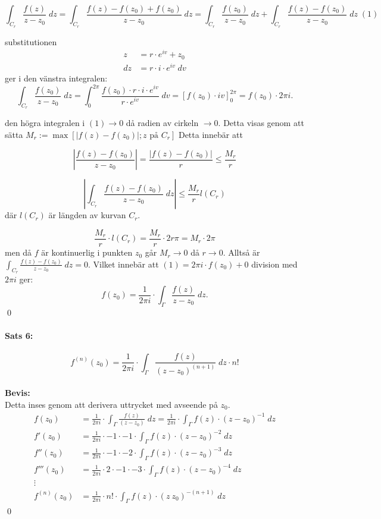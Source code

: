 \[ \int_{C_r} \frac {f(z)} {z - z_0} \; dz = \int_{C_r} \frac {f(z) - f(z_0) + f(z_0)} {z - z_0} \; dz =
	\int_{C_r} \frac {f(z_0)} {z - z_0} \; dz + \int_{C_r} \frac {f(z) - f(z_0)} {z - z_0} \; dz \;(1) \]

substitutionen 
\begin{align*}
	z  &= r \cdot e^{iv} + z_0 \\
	dz &= r \cdot i \cdot e^{iv} \; dv
\end{align*}
ger i den vänstra integralen:
\[ \int_{C_r} \frac {f(z_0)} {z - z_0} \; dz = \int_0^{2\pi} \frac {f(z_0) \cdot r \cdot i \cdot e^{iv} } { r \cdot e^{iv}} \; dv =
	\left [f(z_0) \cdot iv \right ]_0^{2\pi} = f(z_0) \cdot 2 \pi i. \]

den högra integralen i $(1) \rightarrow 0$ då radien av cirkeln $\rightarrow 0$.
Detta visas genom att sätta $M_r := \operatorname{max} [|f(z) - f(z_0)|; z \text{ på } C_r]$
Detta innebär att

\[
	\left | \frac {f(z) - f(z_0)} {z - z_0} \right | = \frac {|f(z) - f(z_0)|} {r} \leq \frac {M_r} {r}
\]

\[
	\left | \int_{C_r} \frac {f(z) - f(z_0)} {z - z_0} \; dz \right | \leq \frac {M_r} {r} l(C_r)
\]
där $l(C_r)$ är längden av kurvan $C_r$.

\[
\frac {M_r} {r} \cdot l(C_r) = \frac {M_r} {r} \cdot 2r\pi = M_r \cdot 2 \pi
\]
men då $f$ är kontinuerlig i punkten $z_0$ går $M_r \rightarrow 0$ då $r \rightarrow 0$.
Alltså är $\int_{C_r} \frac {f(z) - f(z_0)} {z - z_0} \; dz = 0.$ Vilket innebär att $(1) = 2\pi i \cdot f(z_0) + 0$
division med $2\pi i$ ger:
\[
	f(z_0) = \frac {1} {2 \pi i} \cdot \int_{\Gamma} \frac {f(z)} {z - z_0} \; dz.
\]
\hfill \qed
\\

\paragraph{Sats 6:}
\[
	f^{(n)}(z_0) = \frac {1} {2 \pi i} \cdot \int_{\Gamma} \frac {f(z)} {(z - z_0)^{(n + 1)}} \; dz \cdot n!
\]
\\
{\bf Bevis:}\\
Detta inses genom att derivera uttrycket med avseende på $z_0$.
\begin{align*}
	f(z_0) &= \frac {1} {2 \pi i} \cdot \int_{\Gamma} \frac {f(z)} {(z - z_0)} \; dz = \frac {1} {2 \pi i} \cdot \int_{\Gamma}
		f(z) \cdot (z - z_0)^{-1} \; dz \\
	f'(z_0) &= \frac {1} {2 \pi i} \cdot -1 \cdot -1 \cdot \int_{\Gamma} f(z) \cdot (z - z_0)^{-2} \; dz \\
	f''(z_0) &= \frac {1} {2 \pi i} \cdot -1 \cdot -2 \cdot \int_{\Gamma} f(z) \cdot (z - z_0)^{-3} \; dz \\
	f'''(z_0) &= \frac {1} {2 \pi i} \cdot 2 \cdot -1 \cdot -3 \cdot \int_{\Gamma} f(z) \cdot (z - z_0)^{-4} \; dz \\
	\vdots \\
	f^{(n)}(z_0) &= \frac {1} {2 \pi i} \cdot n! \cdot \int_\Gamma f(z) \cdot (z \ z_0)^{-(n + 1)} \; dz
\end{align*} %
\hfill \qed
\\
